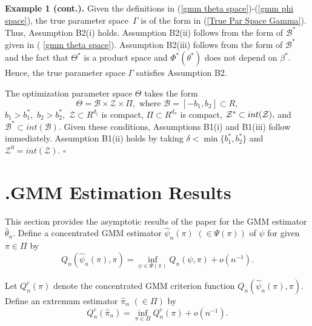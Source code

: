 \documentclass[12pt,thmsb,titlepage,final,oneside,letterpaper]{article}
\begin{document}
\noindent \textbf{Example 1 (cont.). }Given the definitions in (\ref{gmm
theta space})-(\ref{gmm phi space}), the true parameter space\ $\Gamma $ is
of the form in (\ref{True Par Space Gamma}). Thus, Assumption B2(i) holds.
Assumption B2(ii) follows from the form of $\mathcal{B}^{\ast }$ given in (%
\ref{gmm theta space}). Assumption B2(iii) follows from the form of $%
\mathcal{B}^{\ast }$ and the fact that $\Theta ^{\ast }$ is a product space
and $\Phi ^{\ast }(\theta ^{\ast })$ does not depend on $\beta ^{\ast }.$
Hence, the true parameter space $\Gamma $ satisfies Assumption B2.

The optimization parameter space $\Theta $ takes the form%
\begin{equation}
\Theta =\mathcal{B}\times \mathcal{Z}\times \Pi ,\text{ where }\mathcal{B}%
=[-b_{1},b_{2}]\subset R,
\end{equation}%
$b_{1}>b_{1}^{\ast },$ $b_{2}>b_{2}^{\ast },$ $\mathcal{Z}\subset
R^{d_{\zeta }}$ is compact, $\Pi \subset R^{d_{\pi }}$ is compact, $\mathcal{%
Z}^{\ast }\subset int(\mathcal{Z}),$ and $\mathcal{B}^{\ast }\subset int(%
\mathcal{B}).$ Given these conditions, Assumptions B1(i) and B1(iii) follow
immediately. Assumption B1(ii) holds by taking $\delta <\min \{b_{1}^{\ast
},b_{2}^{\ast }\}$ and $\mathcal{Z}^{0}=int(\mathcal{Z}).$ $\square $

\section{ \hspace{-0.34in}\textbf{.}\hspace{0.2in}GMM Estimation Results 
\label{Estimation Results Sec}}

\setcounter{equation}{0}\hspace{0.25in}This section provides the asymptotic
results of the paper for the GMM estimator $\widehat{\theta }_{n}.$ Define a
concentrated GMM estimator $\widehat{\psi }_{n}(\pi )$ $(\in \Psi (\pi ))$
of $\psi $ for given $\pi \in \Pi $ by%
\begin{equation}
Q_{n}(\widehat{\psi }_{n}(\pi ),\pi )=\inf_{\psi \in \Psi (\pi )}Q_{n}(\psi
,\pi )+o(n^{-1}).  \label{Defn psi}
\end{equation}

Let $Q_{n}^{c}(\pi )$ denote the concentrated GMM criterion function $Q_{n}(%
\widehat{\psi }_{n}(\pi ),\pi ).$ Define an extremum estimator $\widehat{\pi 
}_{n}$ $(\in \Pi )$ by 
\begin{equation}
Q_{n}^{c}(\widehat{\pi }_{n})=\inf_{\pi \in \Pi }Q_{n}^{c}(\pi )+o(n^{-1}).
\label{Defn pihat}
\end{equation}
\end{document}
